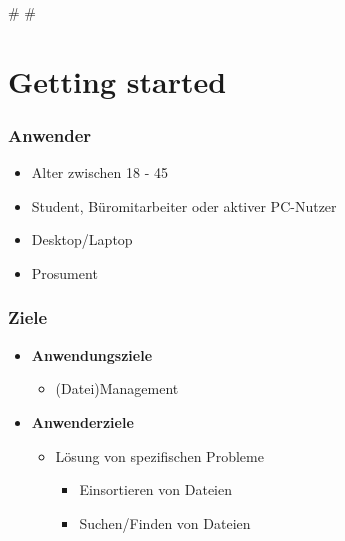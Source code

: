 
\def\mytitle{Methodisches Vorgehen zur Entwicklung des Strukturdesigns}
\def\myauthor{Anastasia Kazakova, Bengt Lüers}
\def\latexmode{beamer}
\def\latexxslt{beamer}
\def\theme{keynote-IntSysTheme}


\# \#

\section{Getting started}
\label{gettingstarted}

\begin{frame}

\frametitle{Anwender}
\label{anwender}

\begin{itemize}
\item Alter zwischen 18 - 45

\item Student, Büromitarbeiter oder aktiver PC-Nutzer

\item Desktop\slash Laptop

\item Prosument

\end{itemize}

\end{frame}

\begin{frame}

\frametitle{Ziele}
\label{ziele}

\begin{itemize}
\item \textbf{Anwendungsziele}

\begin{itemize}
\item (Datei)Management

\end{itemize}

\item \textbf{Anwenderziele}

\begin{itemize}
\item Lösung von spezifischen Probleme

\begin{itemize}
\item Einsortieren von Dateien

\item Suchen\slash Finden von Dateien

\end{itemize}

\end{itemize}

\end{itemize}

\end{frame}

